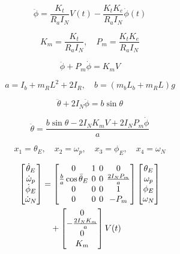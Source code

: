 \documentclass[conference]{IEEEtran}
\begin{document}
\begin{equation}
\ddot{\phi} = \frac{K_t}{R_a I_N} V(t) - \frac{K_t K_e}{R_a I_N} \dot{\phi}(t)
\end{equation}

\begin{equation}
K_m = \frac{K_t}{R_a I_N}, \quad P_m = \frac{K_t K_e}{R_a I_N}
\end{equation}

\begin{equation}
\ddot{\phi} + P_m \dot{\phi} = K_m V
\end{equation}


\begin{equation}
a = I_b + m_R L^2 + 2 I_R, \quad b = (m_b L_b + m_R L) g
\end{equation}

\begin{equation}
\ddot{\theta} + 2 I_N \ddot{\phi} = b \sin\theta
\end{equation}

\begin{equation}
\ddot{\theta} = \frac{b \sin\theta - 2 I_N K_m V + 2 I_N P_m \dot{\phi}}{a}
\end{equation}


\begin{equation}
x_1 = \theta_E, \quad x_2 = \omega_p, \quad x_3 = \phi_E, \quad x_4 = \omega_N
\end{equation}

\begin{equation}
\setlength{\arraycolsep}{2pt}
\begin{aligned}
\begin{bmatrix} \dot{\theta}_E \\ \dot{\omega}_p \\ \dot{\phi}_E \\ \dot{\omega}_N \end{bmatrix} &= 
\begin{bmatrix} 
0 & 1 & 0 & 0 \\ 
\frac{b}{a} \cos\bar{\theta}_E & 0 & 0 & \frac{2 I_N P_m}{a} \\ 
0 & 0 & 0 & 1 \\ 
0 & 0 & 0 & -P_m 
\end{bmatrix} 
\begin{bmatrix} \theta_E \\ \omega_p \\ \phi_E \\ \omega_N \end{bmatrix} \\
&\quad + 
\begin{bmatrix} 0 \\ -\frac{2 I_N K_m}{a} \\ 0 \\ K_m \end{bmatrix} V(t)
\end{aligned}
\end{equation}
\end{document}
